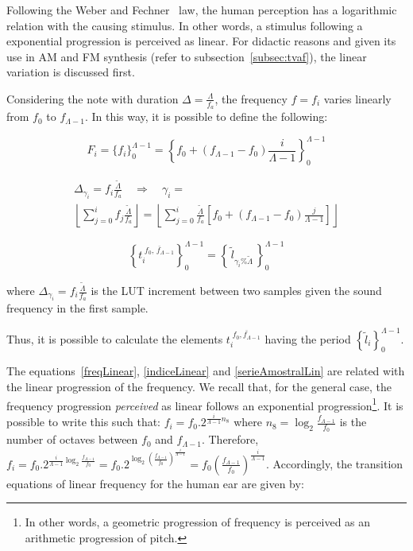 \documentclass[
 aip,
 jmp,
 amsmath,amssymb,
 reprint,
]{revtex4-1}
\begin{document}
Following the Weber and Fechner~\cite{Weber-Fechner} law, the human perception has a logarithmic relation with the causing stimulus. In other words, a stimulus following a exponential progression is perceived as linear.
For didactic reasons and given its use in AM and FM synthesis (refer to subsection~\ref{subsec:tvaf}), the linear variation is discussed first.

Considering the note with duration $\Delta = \frac{\Lambda}{f_a}$, the frequency $f=f_i$ varies linearly from $f_0$ to $f_{\Lambda -1}$. In this way, it is possible to define the following:

\begin{equation}\label{freqLinear}
 F_i=\{f_i\}_0^{\Lambda-1}=\left\{f_0 + (f_{\Lambda-1}-f_0)\frac{i}{\Lambda-1} \right\}_0^{\Lambda-1}
\end{equation}

\begin{multline}\label{indiceLinear}
 \Delta_{\gamma_i}=f_i\frac{\widetilde{\Lambda}}{f_a} \quad \Rightarrow \quad \gamma_i= \\ \left \lfloor \sum_{j=0}^{i} f_j\frac{\widetilde{\Lambda}}{f_a} \right \rfloor   =\left \lfloor \sum_{j=0}^{i} \frac{\widetilde{\Lambda}}{f_a} \left [f_0 + (f_{\Lambda-1}-f_0)\frac{j}{\Lambda-1} \right ] \right \rfloor 
\end{multline}

\begin{equation}\label{serieAmostralLin}
 \left\{t_i^{\;\overline{f_0,\, f_{\Lambda-1}}}\right\}_0^{\Lambda-1}=\left\{\,\widetilde{l}_{\gamma_i \% \widetilde{\Lambda}}\,\right\}_0^{\Lambda-1}
\end{equation}

where $\Delta_{\gamma_i}=f_i\frac{\widetilde{\Lambda}}{f_a}$ is the LUT increment between two samples given the sound frequency in the first sample.

Thus, it is possible to calculate the elements $t_i^{\;\overline{f_0,f_{\Lambda-1}}}$ having the period $\left\{\widetilde{l}_i\right\}_0^{\Lambda-1}$.

The equations~\ref{freqLinear}, \ref{indiceLinear} and \ref{serieAmostralLin} are related with the linear progression of the frequency. We recall that, for the general case, the frequency progression \emph{perceived} as linear follows an exponential progression\footnote{In other words, a geometric progression of frequency is perceived as an arithmetic progression of pitch.}.
It is possible to write this such that: $f_i=f_0 . 2^{\frac{i}{\Lambda-1} n_8}$ where  $n_8=\log_2\frac{f_{\Lambda-1}}{f_0}$ is the number of octaves between $f_0$ and $f_{\Lambda-1}$.
Therefore, $f_i=f_0 . 2^{\frac{i}{\Lambda-1}\log_2\frac{f_{\Lambda-1}}{f_0}}=
 f_0 . 2^{\log_2\left ( \frac{f_{\Lambda-1}}{f_0} \right )^{\frac{i}{\Lambda-1}}}=
 f_0 \left ( \frac{f_{\Lambda-1}}{f_0} \right ) ^{\frac{i}{\Lambda -1}}$. Accordingly, the transition equations of linear frequency for the human ear are given by:
\end{document}
